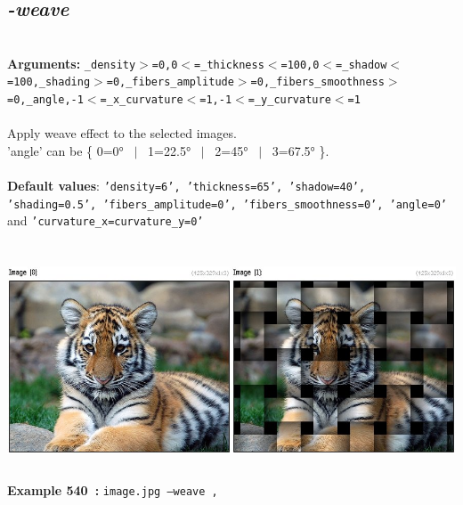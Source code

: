 \documentclass[a4paper,11pt,twoside]{book}
\begin{document}
\subsection{\emph{-weave} }\vspace*{-0.5em}
~\\\textbf{Arguments: } 
{\small \texttt{\_density$>$=0,0$<$=\_thickness$<$=100,0$<$=\_shadow$<$=100,\_shading$>$=0,\_fibers\_amplitude$>$=0,\_fibers\_smoothness$>$=0,\_angle,-1$<$=\_x\_curvature$<$=1,-1$<$=\_y\_curvature$<$=1}}\\~\\
Apply weave effect to the selected images.
~\\'angle' can be \{ 0=0° ~$|$~ 1=22.5° ~$|$~ 2=45° ~$|$~ 3=67.5° \}.
~\\~\\\textbf{Default values}: {\small \texttt{'density=6', 'thickness=65', 'shadow=40', 'shading=0.5', 'fibers\_amplitude=0', 'fibers\_smoothness=0', 'angle=0'} and \texttt{'curvature\_x=curvature\_y=0'}}
\begin{center}\includegraphics[keepaspectratio=true,height=7cm,width=\textwidth]{img/gmic_def540.jpg}\\
{\footnotesize \textbf{Example 540~:} \texttt{image.jpg --weave ,}}
\end{center}
\end{document}
